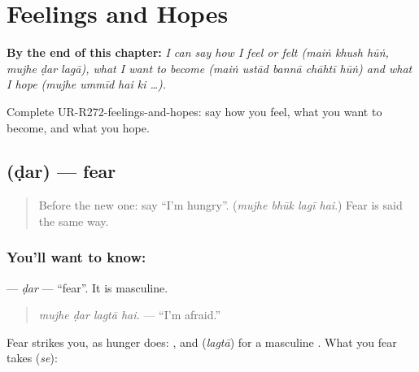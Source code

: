 
\chapter{Feelings and Hopes}
\label{ch:ur-feelings-and-hopes}

\begin{chapteropening}
\textbf{By the end of this chapter:} \emph{I can say how I feel or felt (maiṅ khush hūṅ, mujhe ḍar lagā), what I want to become (maiṅ ustād bannā chāhtī hūṅ) and what I hope (mujhe ummīd hai ki …).}

Complete UR-R272-feelings-and-hopes: say how you feel, what you want to become, and what you hope.
\end{chapteropening}

\section[\texorpdfstring{\ur{ڈر} (ḍar)}{ڈر (ḍar)}]{ (ḍar) — fear}

\label{lesson:UR-C272-dar}



\begin{quote}
Before the new one: say \textquotedblleft{}I'm hungry\textquotedblright{}. (\emph{mujhe bhūk lagī hai}.) Fear is said the same way.
\end{quote}

\subsection*{You'll want to know: }
\textbf{} — \emph{ḍar} — \textquotedblleft{}fear\textquotedblright{}. It is masculine.

\begin{quote}
\textbf{   }
\end{quote}

\begin{quote}
\emph{mujhe ḍar lagtā hai.} — \textquotedblleft{}I'm afraid.\textquotedblright{}
\end{quote}

Fear strikes you, as hunger does: \textbf{}, and \textbf{} (\emph{lagtā}) for a masculine \textbf{}. What you fear takes \textbf{} (\emph{se}):

